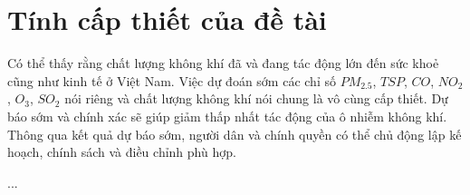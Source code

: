 \section{Tính cấp thiết của đề tài}
Có thể thấy rằng chất lượng không khí đã và đang tác động lớn đến sức khoẻ cũng như kinh tế ở Việt Nam. Việc dự đoán sớm các chỉ số $PM_{2.5}$, $TSP$, $CO$, $NO_2$, $O_3$, $SO_2$ nói riêng và chất lượng không khí nói chung là vô cùng cấp thiết. Dự báo sớm và chính xác sẽ giúp giảm thấp nhất tác động của ô nhiễm không khí. Thông qua kết quả dự báo sớm, người dân và chính quyền có thể chủ động lập kế hoạch, chính sách và điều chỉnh phù hợp.

...